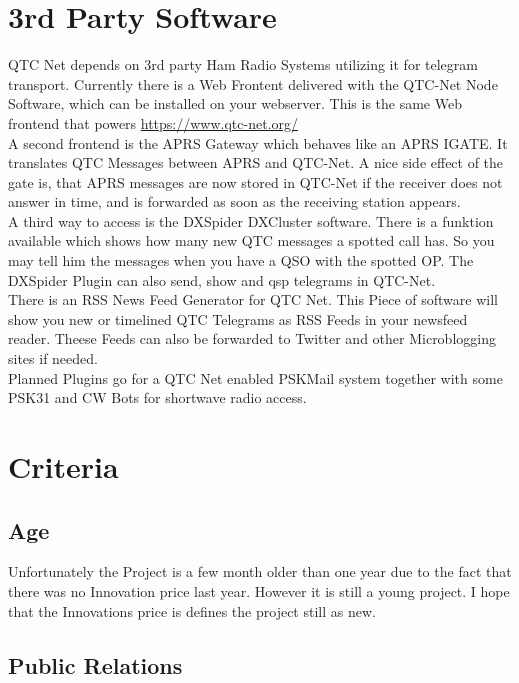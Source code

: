\section{3rd Party Software}

QTC Net depends on 3rd party Ham Radio Systems utilizing it for telegram
transport. Currently there is a Web Frontent delivered with the QTC-Net Node
Software, which can be installed on your webserver. This is the same Web
frontend that powers \url{https://www.qtc-net.org/} \\

A second frontend is the APRS Gateway which behaves like an APRS IGATE. It
translates QTC Messages between APRS and QTC-Net. A nice side effect of the
gate is, that APRS messages are now stored in QTC-Net if the receiver does 
not answer in time, and is forwarded as soon as the receiving station 
appears. \\

A third way to access is the DXSpider DXCluster software. There is a funktion 
available which shows how many new QTC messages a spotted call has. So you may
tell him the messages when you have a QSO with the spotted OP. The DXSpider
Plugin can also send, show and qsp telegrams in QTC-Net. \\

There is an RSS News Feed Generator for QTC Net. This Piece of software will 
show you new or timelined QTC Telegrams as RSS Feeds in your newsfeed reader.
Theese Feeds can also be forwarded to Twitter and other Microblogging sites if
needed. \\ 

Planned Plugins go for a QTC Net enabled PSKMail system together with some 
PSK31 and CW Bots for shortwave radio access. 


\section{Criteria}

\subsection{Age}

Unfortunately the Project is a few month older than one year due to the fact
that there was no Innovation price last year. However it is still a young 
project. I hope that the Innovations price is defines the project still as 
new. 

\subsection{Public Relations}

